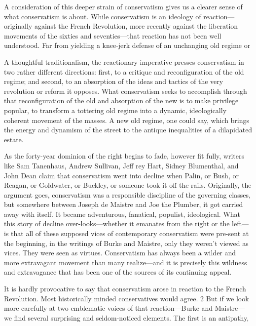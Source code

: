  \par 
A consideration of this deeper strain of conservatism gives us a clearer sense of what conservatism is about. While conservatism is an ideology of reaction—originally against the French Revolution, more recently against the liberation movements of the sixties and seventies—that reaction has not been well understood. Far from yielding a knee-jerk defense of an unchanging old regime or
 \par 
A thoughtful traditionalism, the reactionary imperative presses conservatism in two rather different directions: first, to a critique and reconfiguration of the old regime; and second, to an absorption of the ideas and tactics of the very revolution or reform it opposes. What conservatism seeks to accomplish through that reconfiguration of the old and absorption of the new is to make privilege popular, to transform a tottering old regime into a dynamic, ideologically coherent movement of the masses. A new old regime, one could say, which brings the energy and dynamism of the street to the antique inequalities of a dilapidated estate.
 \par 
As the forty-year dominion of the right begins to fade, however fit fully, writers like Sam Tanenhaus, Andrew Sullivan, Jeff rey Hart, Sidney Blumenthal, and John Dean claim that conservatism went into decline when Palin, or Bush, or Reagan, or Goldwater, or Buckley, or someone took it off the rails. Originally, the argument goes, conservatism was a responsible discipline of the governing classes, but somewhere between Joseph de Maistre and Joe the Plumber, it got carried away with itself. It became adventurous, fanatical, populist, ideological. What this story of decline over-looks—whether it emanates from the right or the left—is that all of these supposed vices of contemporary conservatism were pre-sent at the beginning, in the writings of Burke and Maistre, only they weren’t viewed as vices. They were seen as virtues. Conservatism has always been a wilder and more extravagant movement than many realize—and it is precisely this wildness and extravagance that has been one of the sources of its continuing appeal.
 \par 
It is hardly provocative to say that conservatism arose in reaction to the French Revolution. Most historically minded conservatives would agree. 2 But if we look more carefully at two emblematic voices of that reaction—Burke and Maistre—we find several surprising and seldom-noticed elements. The first is an antipathy,
 \par 
